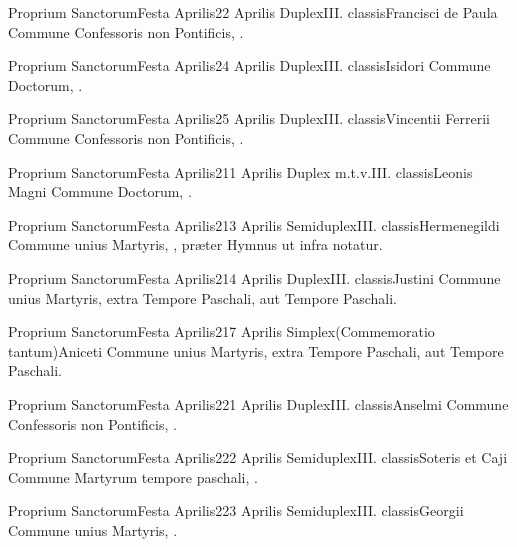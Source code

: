 \documentclass[nocturnale-romanum.tex]{subfiles}
\begin{document}

	{Proprium Sanctorum}{Festa Aprilis}{2}{2 Aprilis}
	{Duplex}{III. classis}{Francisci de Paula}
	{Commune Confessoris non Pontificis, \pageref{M-CONP}.}
	{}

	{Proprium Sanctorum}{Festa Aprilis}{2}{4 Aprilis}
	{Duplex}{III. classis}{Isidori}
	{Commune Doctorum, \pageref{M-CODO}.}
	{}

	{Proprium Sanctorum}{Festa Aprilis}{2}{5 Aprilis}
	{Duplex}{III. classis}{Vincentii Ferrerii}
	{Commune Confessoris non Pontificis, \pageref{M-CONP}.}
	{}

	{Proprium Sanctorum}{Festa Aprilis}{2}{11 Aprilis}
	{Duplex m.t.v.}{III. classis}{Leonis Magni}
	{Commune Doctorum, \pageref{M-CODO}.}
	{}

	{Proprium Sanctorum}{Festa Aprilis}{2}{13 Aprilis}
	{Semiduplex}{III. classis}{Hermenegildi}
	{Commune unius Martyris, \pageref{M-UMEX}, præter Hymnus ut infra notatur.}
	{}

	{Proprium Sanctorum}{Festa Aprilis}{2}{14 Aprilis}
	{Duplex}{III. classis}{Justini}
	{Commune unius Martyris, \pageref{M-UMEX} extra Tempore Paschali, aut \pageref{M-UMTP} Tempore Paschali.}
	{}

	{Proprium Sanctorum}{Festa Aprilis}{2}{17 Aprilis}
	{Simplex}{(Commemoratio tantum)}{Aniceti}
	{Commune unius Martyris, \pageref{M-UMEX} extra Tempore Paschali, aut \pageref{M-UMTP} Tempore Paschali.}
	{}

	{Proprium Sanctorum}{Festa Aprilis}{2}{21 Aprilis}
	{Duplex}{III. classis}{Anselmi}
	{Commune Confessoris non Pontificis, \pageref{M-CONP}.}
	{}

	{Proprium Sanctorum}{Festa Aprilis}{2}{22 Aprilis}
	{Semiduplex}{III. classis}{Soteris et Caji}
	{Commune Martyrum tempore paschali, \pageref{M-PMTP}.}
	{}

	{Proprium Sanctorum}{Festa Aprilis}{2}{23 Aprilis}
	{Semiduplex}{III. classis}{Georgii}
	{Commune unius Martyris, \pageref{M-UMTP}.}
	{}
\end{document}
